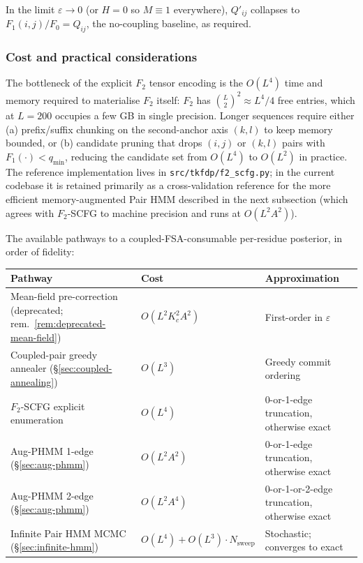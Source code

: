 In the limit $\varepsilon \to 0$ (or $H = 0$ so $M \equiv 1$
everywhere), $Q'_{ij}$ collapses to $F_1(i, j) / F_0 = Q_{ij}$, the
no-coupling baseline, as required.

\subsubsection*{Cost and practical considerations}

The bottleneck of the explicit $F_2$ tensor encoding is the
$O(L^4)$ time and memory required to materialise $F_2$ itself:
$F_2$ has $\binom{L}{2}^2 \approx L^4 / 4$ free entries, which at
$L = 200$ occupies a few GB in single precision. Longer sequences
require either (a) prefix/suffix chunking on the second-anchor
axis $(k, l)$ to keep memory bounded, or (b) candidate pruning
that drops $(i, j)$ or $(k, l)$ pairs with $F_1(\cdot) < q_{\min}$,
reducing the candidate set from $O(L^4)$ to $O(L^2)$ in practice.
The reference implementation lives in \texttt{src/tkfdp/f2\_scfg.py};
in the current codebase it is retained primarily as a
cross-validation reference for the more efficient memory-augmented
Pair HMM described in the next subsection (which agrees with
$F_2$-SCFG to machine precision and runs at $O(L^2 A^2)$).

The available pathways to a coupled-FSA-consumable per-residue
posterior, in order of fidelity:

\begin{center}
\begin{tabular}{lll}
\textbf{Pathway} & \textbf{Cost} & \textbf{Approximation} \\
\hline
Mean-field pre-correction (deprecated; rem.~\ref{rem:deprecated-mean-field}) & $O(L^2 K_c^2 A^2)$ & First-order in $\varepsilon$ \\
Coupled-pair greedy annealer (\S\ref{sec:coupled-annealing}) & $O(L^3)$ & Greedy commit ordering \\
$F_2$-SCFG explicit enumeration & $O(L^4)$ & 0-or-1-edge truncation, otherwise exact \\
Aug-PHMM 1-edge (\S\ref{sec:aug-phmm}) & $O(L^2 A^2)$ & 0-or-1-edge truncation, otherwise exact \\
Aug-PHMM 2-edge (\S\ref{sec:aug-phmm}) & $O(L^2 A^4)$ & 0-or-1-or-2-edge truncation, otherwise exact \\
Infinite Pair HMM MCMC (\S\ref{sec:infinite-hmm}) & $O(L^4) + O(L^3) \cdot N_{\mathrm{sweep}}$ & Stochastic; converges to exact \\
\end{tabular}
\end{center}


